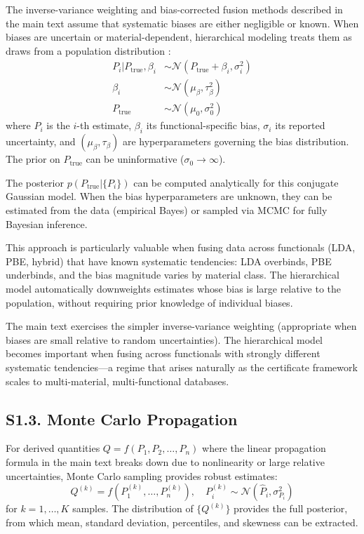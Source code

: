﻿\documentclass[prb,onecolumn,superscriptaddress,amsmath,amssymb,longbibliography]{revtex4-2}
\begin{document}
The inverse-variance weighting and bias-corrected fusion methods described in
the main text assume that systematic biases are either negligible or known.
When biases are uncertain or material-dependent, hierarchical modeling treats
them as draws from a population distribution \cite{Kennedy2001,Sivia2006}:
\begin{align}
    P_i | P_{\mathrm{true}}, \beta_i &\sim \mathcal{N}(P_{\mathrm{true}} + \beta_i, \sigma_i^2) \\
    \beta_i &\sim \mathcal{N}(\mu_\beta, \tau_\beta^2) \\
    P_{\mathrm{true}} &\sim \mathcal{N}(\mu_0, \sigma_0^2)
\end{align}
where $P_i$ is the $i$-th estimate, $\beta_i$ its functional-specific bias,
$\sigma_i$ its reported uncertainty, and $(\mu_\beta, \tau_\beta)$ are
hyperparameters governing the bias distribution. The prior on
$P_{\mathrm{true}}$ can be uninformative ($\sigma_0 \to \infty$).

The posterior $p(P_{\mathrm{true}} | \{P_i\})$ can be computed analytically for
this conjugate Gaussian model. When the bias hyperparameters are unknown, they
can be estimated from the data (empirical Bayes) or sampled via MCMC for fully
Bayesian inference.

This approach is particularly valuable when fusing data across functionals
(LDA, PBE, hybrid) that have known systematic tendencies: LDA overbinds, PBE
underbinds, and the bias magnitude varies by material class. The hierarchical
model automatically downweights estimates whose bias is large relative to the
population, without requiring prior knowledge of individual biases.

The main text exercises the simpler inverse-variance weighting (appropriate
when biases are small relative to random uncertainties). The hierarchical
model becomes important when fusing across functionals with strongly different
systematic tendencies---a regime that arises naturally as the certificate
framework scales to multi-material, multi-functional databases.


\subsection{S1.3. Monte Carlo Propagation}
\label{sec:si_mc}

For derived quantities $Q = f(P_1, P_2, \ldots, P_n)$ where the linear
propagation formula in the main text breaks down due to nonlinearity or
large relative uncertainties, Monte Carlo sampling provides robust estimates:
\begin{equation}
    Q^{(k)} = f(P_1^{(k)}, \ldots, P_n^{(k)}), \quad
    P_i^{(k)} \sim \mathcal{N}(\hat{P}_i, \sigma_{P_i}^2)
\end{equation}
for $k = 1, \ldots, K$ samples. The distribution of $\{Q^{(k)}\}$ provides
the full posterior, from which mean, standard deviation, percentiles, and
skewness can be extracted.
\end{document}

